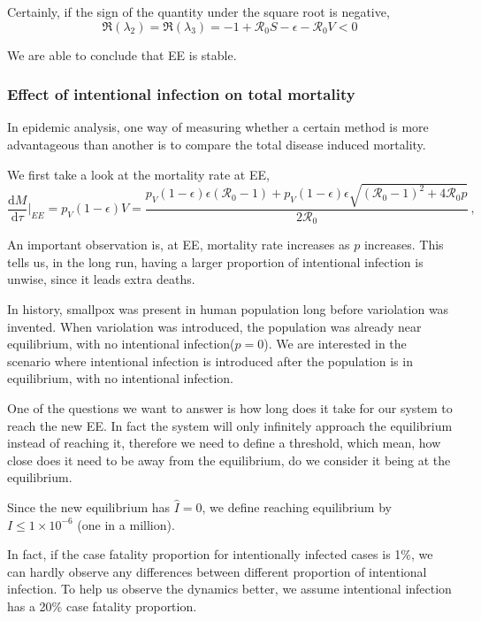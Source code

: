 \documentclass[12pt]{article}
\newcommand\dbyd[2]{\frac{\mathrm d{#1}}{\mathrm d{#2}}}
\newcommand{\R}{\mathcal{R}}
\newcommand{\pmV}{p_{V}}
\begin{document}
Certainly, if the sign of the quantity under the square root is negative,
\begin{equation}
\Re(\lambda_2)=\Re(\lambda_3)=-1+\R_0 S-\epsilon-\R_0 V<0
\end{equation}

We are able to conclude that EE is stable.

\subsubsection{Effect of intentional infection on total mortality}

In epidemic analysis, one way of measuring whether a certain method is more advantageous than another is to compare the total disease induced mortality. 

We first take a look at the mortality rate at EE,
\begin{equation}
\dbyd{M}{\tau}|_{EE}=\pmV(1-\epsilon)V=\frac{\pmV(1-\epsilon)\epsilon(\R_0 -1)+ \pmV(1-\epsilon)\epsilon \sqrt{(\R_0-1)^2+4\R_0 p}}{2\R_0}\,, \label{eq:dMdt}
\end{equation}

An important observation is, at EE, mortality rate increases as $p$ increases. This tells us, in the long run, having a larger proportion of intentional infection is unwise, since it leads extra deaths.

In history, smallpox was present in human population long before variolation was invented. When variolation was introduced, the population was already near equilibrium, with no intentional infection($p=0$). We are interested in the scenario where intentional infection is introduced after the population is in equilibrium, with no intentional infection.

One of the questions we want to answer is how long does it take for our system to reach the new EE. In fact the system will only infinitely approach the equilibrium instead of reaching it, therefore we need to define a threshold, which mean, how close does it need to be away from the equilibrium, do we consider it being at the equilibrium.

Since the new equilibrium has $\hat{I}=0$, we define reaching equilibrium by $I\leq 1\times 10^{-6}$ (one in a million).

In fact, if the case fatality proportion for intentionally infected cases is 1\%, we can hardly observe any differences between different proportion of intentional infection. To help us observe the dynamics better, we assume intentional infection has a 20\% case fatality proportion.
\end{document}
